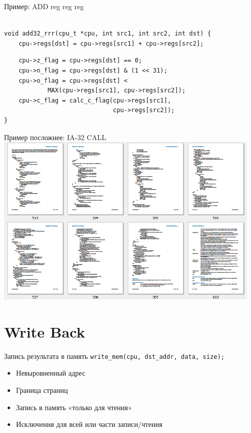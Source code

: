 \documentclass{beamer}
\begin{document}
\begin{frame}[fragile]{Пример: ADD reg reg reg}
\begin{verbatim}

void add32_rrr(cpu_t *cpu, int src1, int src2, int dst) {
    cpu->regs[dst] = cpu->regs[src1] + cpu->regs[src2];
\end{verbatim}
\pause

\begin{verbatim}
    cpu->z_flag = cpu->regs[dst] == 0;
    cpu->n_flag = cpu->regs[dst] & (1 << 31);
    cpu->o_flag = cpu->regs[dst] < 
            MAX(cpu->regs[src1], cpu->regs[src2]);
    cpu->c_flag = calc_c_flag(cpu->regs[src1],
                              cpu->regs[src2]);
}
\end{verbatim}
\end{frame}

\begin{frame}{Пример посложнее: IA-32 CALL}
\centering
\includegraphics[width=0.95\textwidth]{./ia32-call}

\end{frame}

\section{Write Back}

\begin{frame}{Запись результата в память}
\texttt{write_mem(cpu, dst_addr, data, size);}\pause

\begin{itemize}
    \item Невыровненный адрес
    \item Граница страниц
    \item Запись в память «только для чтения»
    \item Исключения для всей или части записи/чтения
\end{itemize}

\end{frame}
\end{document}
